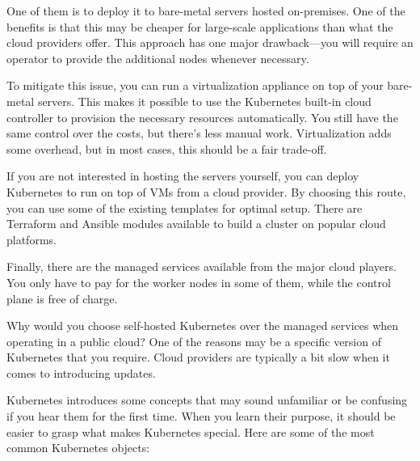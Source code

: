 One of them is to deploy it to bare-metal servers hosted on-premises. One of the benefits is that this may be cheaper for large-scale applications than what the cloud providers offer. This approach has one major drawback—you will require an operator to provide the additional nodes whenever necessary.

To mitigate this issue, you can run a virtualization appliance on top of your bare-metal servers. This makes it possible to use the Kubernetes built-in cloud controller to provision the necessary resources automatically. You still have the same control over the costs, but there's less manual work. Virtualization adds some overhead, but in most cases, this should be a fair trade-off.

If you are not interested in hosting the servers yourself, you can deploy Kubernetes to run on top of VMs from a cloud provider. By choosing this route, you can use some of the existing templates for optimal setup. There are Terraform and Ansible modules available to build a cluster on popular cloud platforms.

Finally, there are the managed services available from the major cloud players. You only have to pay for the worker nodes in some of them, while the control plane is free of charge.

Why would you choose self-hosted Kubernetes over the managed services when operating in a public cloud? One of the reasons may be a specific version of Kubernetes that you require. Cloud providers are typically a bit slow when it comes to introducing updates.


Kubernetes introduces some concepts that may sound unfamiliar or be confusing if you hear them for the first time. When you learn their purpose, it should be easier to grasp what makes Kubernetes special. Here are some of the most common Kubernetes objects:

